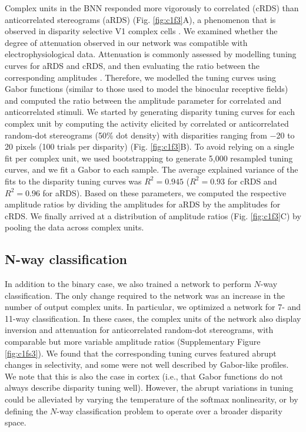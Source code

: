 Complex units in the BNN responded more vigorously to correlated (cRDS) than anticorrelated stereograms (aRDS) (Fig. \ref{fig:c1f3}A), a phenomenon that is observed in disparity selective V1 complex cells \cite{Cumming:1997ve,Samonds:2013cs}. We examined whether the degree of attenuation observed in our network was compatible with electrophysiological data. Attenuation is commonly assessed by modelling tuning curves for aRDS and cRDS, and then evaluating the ratio between the corresponding amplitudes \cite{Cumming:1997ve,Tanabe:2004mw,Nieder:2001jl}. Therefore, we modelled the tuning curves using Gabor functions (similar to those used to model the binocular receptive fields) and computed the ratio between the amplitude parameter for correlated and anticorrelated stimuli. We started by generating disparity tuning curves for each complex unit by computing the activity elicited by correlated or anticorrelated random-dot stereograms (50\% dot density) with disparities ranging from $-$20 to 20 pixels (100 trials per disparity) (Fig. \ref{fig:c1f3}B). To avoid relying on a single fit per complex unit, we used bootstrapping to generate 5,000 resampled tuning curves, and we fit a Gabor to each sample. The average explained variance of the fits to the disparity tuning curves was $R^2 = 0.945$ ($R^2=0.93$ for cRDS and $R^2=0.96$ for aRDS). Based on these parameters, we computed the respective amplitude ratios by dividing the amplitudes for aRDS by the amplitudes for cRDS. We finally arrived at a distribution of amplitude ratios (Fig. \ref{fig:c1f3}C) by pooling the data across complex units.

\subsection*{N-way classification}

In addition to the binary case, we also trained a network to perform $N$-way classification. The only change required to the network was an increase in the number of output complex units. In particular, we optimized a network for 7- and 11-way classification. In these cases, the complex units of the network also display inversion and attenuation for anticorrelated random-dot stereograms, with comparable but more variable amplitude ratios (Supplementary Figure \ref{fig:c1fs3}). We found that the corresponding tuning curves featured abrupt changes in selectivity, and some were not well described by Gabor-like profiles. We note that this is also the case in cortex (i.e., that Gabor functions do not always describe disparity tuning well). However, the abrupt variations in tuning could be alleviated by varying the temperature of the $\mathrm{softmax}$ nonlinearity, or by defining the $N$-way classification problem to operate over a broader disparity space.


